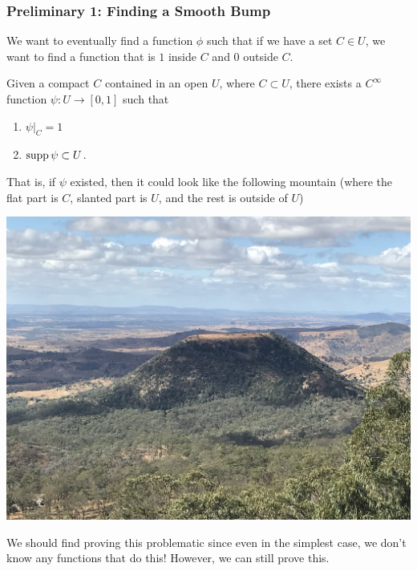 \documentclass{article}
\numberwithin{equation}{section}
\begin{document}
\subsubsection{Preliminary 1: Finding a Smooth Bump}
We want to eventually find a function $\phi$ such that if we have a set $C\in U$, we want to find a function that is $1$ inside $C$ and $0$ outside $C$.
\begin{lemma}
    Given a compact $C$ contained in an open $U$, where $C \subset U$, there exists a $C^\infty$ function $\psi: U \rightarrow [0,1]$ such that 
    \begin{enumerate}
        \item $\psi|_C = 1$
        \item $\operatorname{supp} \psi \subset U$.
    \end{enumerate}
\end{lemma}
That is, if $\psi$ existed, then it could look like the following mountain (where the flat part is $C$, slanted part is $U$, and the rest is outside of $U$) 
\begin{center}
    \includegraphics[width=0.5\linewidth]{figures/tabletop.jpg}
\end{center}
We should find proving this problematic since even in the simplest case, we don't know any functions that do this! However, we can still prove this.
\end{document}
